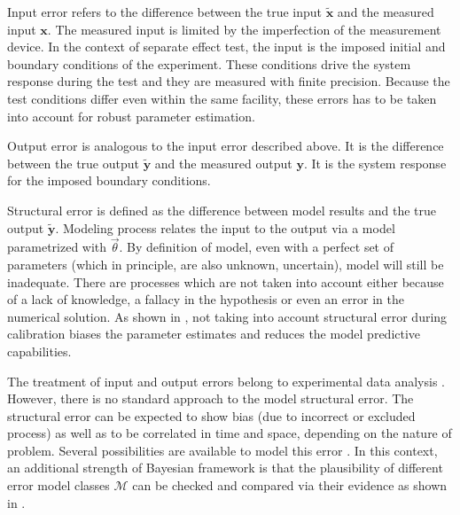 \documentclass[11pt,titlepage]{article}
\begin{document}
Input error refers to the difference between the true input $\mathbf{\tilde{x}}$ and the measured input $\mathbf{x}$. 
The measured input is limited by the imperfection of the measurement device. 
In the context of separate effect test, the input is the imposed initial and boundary conditions of the experiment. 
These conditions drive the system response during the test and they are measured with finite precision. 
Because the test conditions differ even within the same facility, these errors has to be taken into account for robust parameter estimation.

Output error is analogous to the input error described above. 
It is the difference between the true output $\mathbf{\tilde{y}}$ and the measured output $\mathbf{y}$. 
It is the system response for the imposed boundary conditions. 

Structural error is defined as the difference between model results and the true output $\mathbf{\tilde{y}}$. 
Modeling process relates the input to the output via a model parametrized with $\vec{\theta}$. 
By definition of model, even with a perfect set of parameters (which in principle, are also unknown, uncertain), model will still be inadequate. 
There are processes which are not taken into account either because of a lack of knowledge, a fallacy in the hypothesis or even an error in the numerical solution. 
As shown in \cite{KennedyOHagan2001}, not taking into account structural error during calibration biases the parameter estimates and reduces the model predictive capabilities.

The treatment of input and output errors belong to experimental data analysis . 
However, there is no standard approach to the model structural error. 
The structural error can be expected to show bias (due to incorrect or excluded process) as well as to be correlated in time and space, depending on the nature of problem. 
Several possibilities are available to model this error \cite{Simoen2013, Schoups2010}. 
In this context, an additional strength of Bayesian framework is that the plausibility of different error model classes $\mathcal{M}$ can be checked and compared via their evidence as shown in \cite{Beck2010}.
\end{document}
